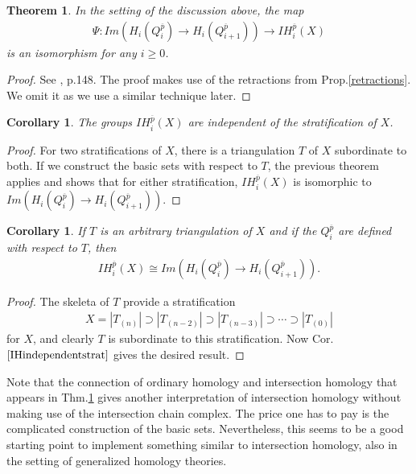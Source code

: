 \documentclass{scrreprt}
\newtheorem{theorem}[prop]{Theorem}
\newtheorem{corollar}[prop]{Corollary}
\begin{document}
\begin{theorem}\label{theorembasicsets}
In the setting of the discussion above, the map
\begin{align*}
\Psi: Im(H_i(Q_{i}^{\overline{p}}) \to H_i(Q_{i+1}^{\overline{p}})) \to IH_i^{\overline{p}}(X)
\end{align*}
is an isomorphism for any $i \geq 0$.
\end{theorem}

\begin{proof}
See \cite{GM}, p.148. The proof makes use of the retractions from Prop.\ref{retractions}. We omit it as we use a similar technique later.
\end{proof}

\begin{corollar}\label{IHindependentstrat}
The groups $IH_i^{\overline{p}}(X)$ are independent of the stratification of $X$.
\end{corollar}

\begin{proof}
For two stratifications of $X$, there is a triangulation $T$ of $X$ subordinate to both. If we construct the basic sets with respect to $T$, the previous theorem applies and shows that for either stratification, $IH_i^{\overline{p}}(X)$ is isomorphic to $Im(H_i(Q_{i}^{\overline{p}}) \to H_i(Q_{i+1}^{\overline{p}}))$.
\end{proof}

\begin{corollar}\label{IHindependenttriang}
If $T$ is an arbitrary triangulation of $X$ and if the $Q_i^{\overline{p}}$ are defined with respect to $T$, then
\begin{align*}
IH_i^{\overline{p}}(X) \cong Im(H_i(Q_{i}^{\overline{p}}) \to H_i(Q_{i+1}^{\overline{p}})).
\end{align*}
\end{corollar}

\begin{proof}
The skeleta of $T$ provide a stratification
\begin{align*}
X= |T_{(n)}| \supset |T_{(n-2)}| \supset |T_{(n-3)}| \supset \cdots \supset |T_{(0)}|
\end{align*}
for $X$, and clearly $T$ is subordinate to this stratification. Now Cor.$\ref{IHindependentstrat}$ gives the desired result.
\end{proof}

Note that the connection of ordinary homology and intersection homology that appears in Thm.\ref{theorembasicsets} gives another interpretation of intersection homology without making use of the intersection chain complex. The price one has to pay is the complicated construction of the basic sets. Nevertheless, this seems to be a good starting point to implement something similar to intersection homology, also in the setting of generalized homology theories.
\end{document}
